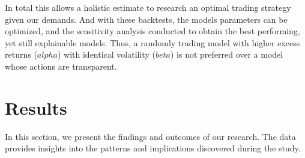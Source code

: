 \documentclass[12pt]{article}
\begin{document}
In total this allows a holistic estimate to research an optimal trading strategy given our demands. And with these backtests, the models parameters can be optimized, and the sensitivity analysis conducted to obtain the best performing, yet still explainable models. Thus, a randomly trading model with higher excess returns ($alpha$) with identical volatility ($beta$) is not preferred over a model whose actions are transparent. 

\section{Results} %
In this section, we present the findings and outcomes of our research. The data provides insights into the patterns and implications discovered during the study.
\label{sec:results}

\end{document}
